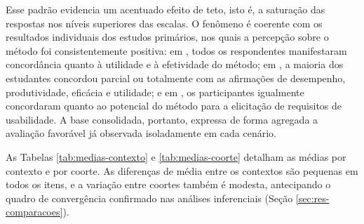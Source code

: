 \FloatBarrier

Esse padrão evidencia um acentuado efeito de teto, isto é, a saturação das respostas nos níveis superiores das escalas. O fenômeno é coerente com os resultados individuais dos estudos primários, nos quais a percepção sobre o método foi consistentemente positiva: em , todos os respondentes manifestaram concordância quanto à utilidade e à efetividade do método; em , a maioria dos estudantes concordou parcial ou totalmente com as afirmações de desempenho, produtividade, eficácia e utilidade; e em , os participantes igualmente concordaram quanto ao potencial do método para a elicitação de requisitos de usabilidade. A base consolidada, portanto, expressa de forma agregada a avaliação favorável já observada isoladamente em cada cenário.

As Tabelas \ref{tab:medias-contexto} e \ref{tab:medias-coorte} detalham as médias por contexto e por coorte. As diferenças de média entre os contextos são pequenas em todos os itens, e a variação entre coortes também é modesta, antecipando o quadro de convergência confirmado nas análises inferenciais (Seção \ref{sec:res-comparacoes}).

\begin{table}[h!]
\centering
\captionsetup{width=15cm}
\caption{Médias das variáveis-núcleo por contexto}
\label{tab:medias-contexto}
\end{table}

